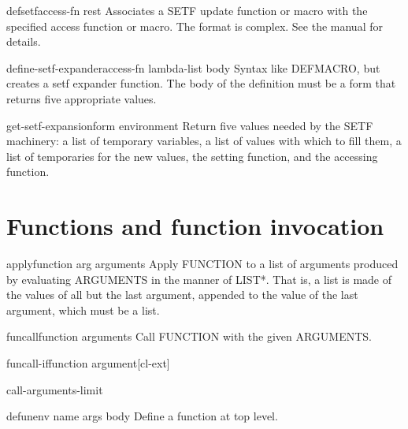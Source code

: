 \documentclass[10pt,english]{book}
\begin{document}
\begin{macro}{defsetf}{access-fn \rest rest}
  Associates a SETF update function or macro with the specified access
  function or macro. The format is complex. See the manual for details.
\end{macro}

\begin{macro}{define-setf-expander}{access-fn lambda-list \body body}
  Syntax like DEFMACRO, but creates a setf expander function. The body
  of the definition must be a form that returns five appropriate values.
\end{macro}

\begin{function}{get-setf-expansion}{form \op environment}
  Return five values needed by the SETF machinery: a list of temporary
   variables, a list of values with which to fill them, a list of temporaries
   for the new values, the setting function, and the accessing function.
\end{function}

\section{Functions and function invocation}
\label{sec:function-invocation}

\begin{function}{apply}{function arg \rest arguments}
  Apply FUNCTION to a list of arguments produced by evaluating ARGUMENTS in
  the manner of LIST*. That is, a list is made of the values of all but the
  last argument, appended to the value of the last argument, which must be a
  list.
\end{function}

\begin{function}{funcall}{function \rest arguments}
  Call FUNCTION with the given ARGUMENTS.
\end{function}

\begin{function}{funcall-if}{function argument}[cl-ext]

\end{function}

\begin{constant}{call-arguments-limit}{}
  
\end{constant}

\begin{macro}{defun}{\env env name args \body body}
  Define a function at top level.
\end{macro}
\end{document}
